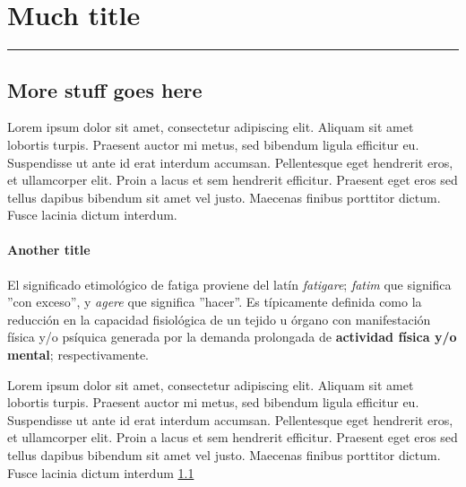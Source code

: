 \chapter{Much title}\label{capit:cap2}
\vspace{-2.0325ex}%
\noindent
\rule{\textwidth}{0.5pt}
\vspace{-5.5ex}%
\newcommand{\pushline}{\Indp}%

\section{More stuff goes here}\label{secc:introduccion}
Lorem ipsum dolor sit amet, consectetur adipiscing elit. Aliquam sit amet lobortis turpis. Praesent auctor mi metus, sed bibendum ligula efficitur eu. Suspendisse ut ante id erat interdum accumsan. Pellentesque eget hendrerit eros, et ullamcorper elit. Proin a lacus et sem hendrerit efficitur. Praesent eget eros sed tellus dapibus bibendum sit amet vel justo. Maecenas finibus porttitor dictum. Fusce lacinia dictum interdum. 
 
\subsubsection{Another title}\label{secc:fatiga}
El significado etimológico de fatiga proviene del latín \textit{fatigare}; \textit{fatim} que significa ''con exceso'', y \textit{agere} que significa ''hacer''. Es típicamente definida como la reducción en la capacidad fisiológica de un tejido u órgano con manifestación física y/o psíquica generada por la demanda prolongada de \textbf{actividad física y/o mental}; respectivamente.

Lorem ipsum dolor sit amet, consectetur adipiscing elit. Aliquam sit amet lobortis turpis. Praesent auctor mi metus, sed bibendum ligula efficitur eu. Suspendisse ut ante id erat interdum accumsan. Pellentesque eget hendrerit eros, et ullamcorper elit. Proin a lacus et sem hendrerit efficitur. Praesent eget eros sed tellus dapibus bibendum sit amet vel justo. Maecenas finibus porttitor dictum. Fusce lacinia dictum interdum \ref{secc:introduccion}

